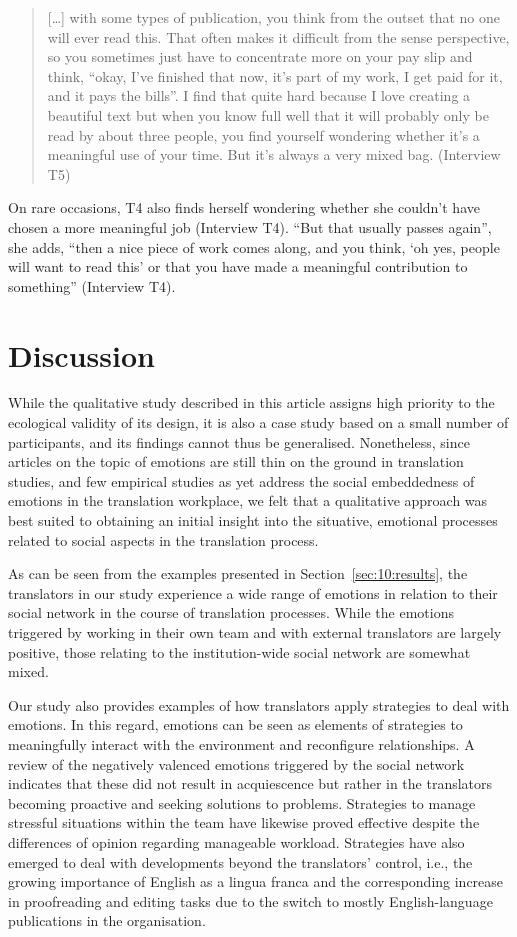 \documentclass[output=paper]{langscibook}
\begin{document}
\begin{quote}
    […] with some types of publication, you think from the outset that no one will ever read this. That often makes it difficult from the sense perspective, so you sometimes just have to concentrate more on your pay slip and think, ``okay, I’ve finished that now, it’s part of my work, I get paid for it, and it pays the bills''. I find that quite hard because I love creating a beautiful text but when you know full well that it will probably only be read by about three people, you find yourself wondering whether it’s a meaningful use of your time. But it’s always a very mixed bag. (Interview T5)
\end{quote}

\noindent
On rare occasions, T4 also finds herself wondering whether she couldn’t have chosen a more meaningful job (Interview T4). “But that usually passes again”, she adds, “then a nice piece of work comes along, and you think, ‘oh yes, people will want to read this’ or that you have made a meaningful contribution to something” (Interview T4).

\section{Discussion}
While the qualitative study described in this article assigns high priority to the ecological validity of its design, it is also a case study based on a small number of participants, and its findings cannot thus be generalised. Nonetheless, since articles on the topic of emotions are still thin on the ground in translation studies, and few empirical studies as yet address the social embeddedness of emotions in the translation workplace, we felt that a qualitative approach was best suited to obtaining an initial insight into the situative, emotional processes related to social aspects in the translation process.

As can be seen from the examples presented in Section~\ref{sec:10:results}, the translators in our study experience a wide range of emotions in relation to their social network in the course of translation processes. While the emotions triggered by working in their own team and with external translators are largely positive, those relating to the institution-wide social network are somewhat mixed.

Our study also provides examples of how translators apply strategies to deal with emotions. In this regard, emotions can be seen as elements of strategies to meaningfully interact with the environment and reconfigure relationships. A review of the negatively valenced emotions triggered by the social network indicates that these did not result in acquiescence but rather in the translators becoming proactive and seeking solutions to problems. Strategies to manage stressful situations within the team have likewise proved effective despite the differences of opinion regarding manageable workload. Strategies have also emerged to deal with developments beyond the translators’ control, i.e., the growing importance of English as a lingua franca and the corresponding increase in proofreading and editing tasks due to the switch to mostly English-language publications in the organisation.
\end{document}
